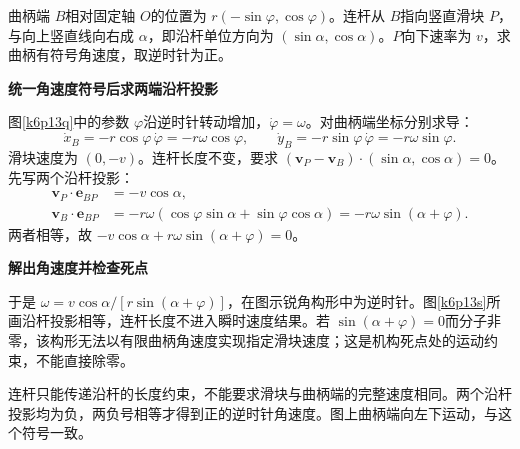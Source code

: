 \begin{question}\begin{example}[竖直滑块与曲柄的瞬时角速度]\label{k6p13}
曲柄端 $B$相对固定轴 $O$的位置为 $r(-\sin\varphi,\cos\varphi)$。连杆从 $B$指向竖直滑块 $P$，与向上竖直线向右成 $\alpha$，即沿杆单位方向为 $(\sin\alpha,\cos\alpha)$。$P$向下速率为 $v$，求曲柄有符号角速度，取逆时针为正。\end{example}
\end{question}
\begin{solution}\textbf{统一角速度符号后求两端沿杆投影}\par\nobreak
图\ref{k6p13q}中的参数 $\varphi$沿逆时针转动增加，$\dot\varphi=\omega$。对曲柄端坐标分别求导：
\[
 \dot x_B=-r\cos\varphi\,\dot\varphi=-r\omega\cos\varphi,
 \qquad \dot y_B=-r\sin\varphi\,\dot\varphi=-r\omega\sin\varphi.
\]
滑块速度为 $(0,-v)$。连杆长度不变，要求 $(\bm v_P-\bm v_B)\cdot(\sin\alpha,\cos\alpha)=0$。先写两个沿杆投影：
\begin{align*}
 \bm v_P\cdot\bm e_{BP}&=-v\cos\alpha,\\
 \bm v_B\cdot\bm e_{BP}
 &=-r\omega(\cos\varphi\sin\alpha+\sin\varphi\cos\alpha)
 =-r\omega\sin(\alpha+\varphi).
\end{align*}
两者相等，故 $-v\cos\alpha+r\omega\sin(\alpha+\varphi)=0$。



\par\medskip{}\noindent\textbf{解出角速度并检查死点}\par\nobreak
于是 $\boxed{\omega=v\cos\alpha/[r\sin(\alpha+\varphi)]}$，在图示锐角构形中为逆时针。图\ref{k6p13s}所画沿杆投影相等，连杆长度不进入瞬时速度结果。若 $\sin(\alpha+\varphi)=0$而分子非零，该构形无法以有限曲柄角速度实现指定滑块速度；这是机构死点处的运动约束，不能直接除零。

连杆只能传递沿杆的长度约束，不能要求滑块与曲柄端的完整速度相同。两个沿杆投影均为负，两负号相等才得到正的逆时针角速度。图上曲柄端向左下运动，与这个符号一致。\end{solution}

